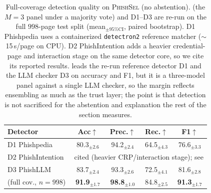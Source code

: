 \begin{table}[!h]
\caption{Full-coverage detection quality on \textsc{PhishSel} (no abstention).
\toolname{} (the $M{=}3$ panel under a majority vote) and D1--D3 are re-run on the
full $998$-page test split (mean$_{\pm\text{95\% CI}}$, paired bootstrap).
D1 Phishpedia uses a containerized \texttt{detectron2} reference matcher ($\sim$15\,s/page on CPU).
D2 PhishIntention adds a heavier credential-page and interaction stage on the same detector
core, so we cite its reported results. \toolname{} leads the re-run reference detector D1
and the LLM checker D3 on accuracy and F1, but it is a three-model panel against a single
LLM checker, so the margin reflects ensembling as much as the trust layer; the point is that
detection is not sacrificed for the abstention and explanation the rest of the section
measures.}
\label{tab:detect}
\footnotesize
\setlength{\tabcolsep}{4.0pt}
\begin{tabular}{lcccc}
\toprule
Detector & Acc$\uparrow$ & Prec.$\uparrow$ & Rec.$\uparrow$ & F1$\uparrow$ \\
\midrule
D1 Phishpedia~\cite{lin2021phishpedia}        & 80.3$_{\pm2.6}$ & 94.2$_{\pm2.4}$ & 64.5$_{\pm4.3}$ & 76.6$_{\pm3.3}$ \\
D2 PhishIntention~\cite{liu2022phishintention} & \multicolumn{4}{c}{cited (heavier CRP/interaction stage); see \cite{liu2022phishintention}} \\
D3 PhishLLM~\cite{tan2024phishllm}             & 83.7$_{\pm2.4}$ & 93.3$_{\pm2.6}$ & 72.5$_{\pm4.1}$ & 81.6$_{\pm2.8}$ \\
\midrule
\textbf{\toolname{}} (full cov., $n{=}998$)   & \textbf{91.9}$_{\pm1.7}$ & \textbf{98.8}$_{\pm1.0}$ & 84.8$_{\pm2.5}$ & \textbf{91.3}$_{\pm1.7}$ \\
\bottomrule
\end{tabular}
\end{table}
